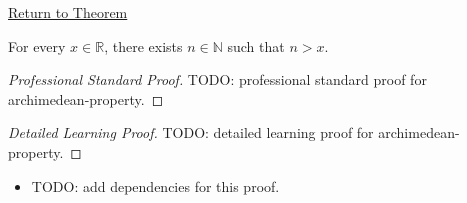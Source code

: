 \newpage
{}
\label{prf:archimedean-property}

\begin{remark*}[Return]
\hyperref[thm:archimedean-property]{Return to Theorem}
\end{remark*}

\begin{theorem*}
For every $x \in \mathbb{R}$, there exists $n \in \mathbb{N}$ such that $n > x$.
\end{theorem*}

\begin{proof}[Professional Standard Proof]
\LRAProofBodyStart
TODO: professional standard proof for archimedean-property.
\end{proof}

\begin{proof}[Detailed Learning Proof]
\LRAProofBodyStart
TODO: detailed learning proof for archimedean-property.
\end{proof}

\begin{remark*}
\end{remark*}

\begin{dependencies}
\begin{itemize}
  \item TODO: add dependencies for this proof.
\end{itemize}
\end{dependencies}

\clearpage
